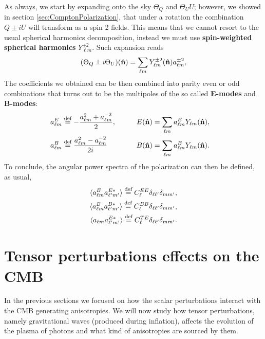 As always, we start by expanding onto the sky $\Theta_Q$ and $\Theta_UU$; however, we showed in section \ref{sec:ComptonPolarization}, that under a rotation the combination $Q\pm iU$ will transform as a spin 2 fields. This means that we cannot resort to the usual spherical harmonics decomposition, instead we must use \textbf{spin-weighted spherical harmonics} $Y_{\ell m}^{\pm2}$. Such expansion reads
\begin{equation}
    (\Theta_Q\pm i\Theta_U)(\mathbf{\hat{n}})=\sum_{\ell m} Y^{\pm2}_{\ell m}(\mathbf{\hat{n}})a^{\pm2}_{\ell m} ,\label{eq:EB_sky_expansion}
\end{equation}
The coefficients we obtained can be then combined into parity even or odd combinations that turns out to be the multipoles of the so called \textbf{E-modes} and \textbf{B-modes}:
\begin{align*}
    a^E_{\ell m}&\stackrel{\text{def}}{=}-\frac{a^2_{\ell m}+a^{-2}_{\ell m}}{2},\qquad &E(\mathbf{\hat{n}})=\sum_{\ell m}a^E_{\ell m}Y_{\ell m}(\mathbf{\hat{n}}),&&\\ a^B_{\ell m}&\stackrel{\text{def}}{=}\frac{a^2_{\ell m}-a^{-2}_{\ell m}}{2i}
    \qquad &B(\mathbf{\hat{n}})=\sum_{\ell m}a^B_{\ell m}Y_{\ell m}(\mathbf{\hat{n}}).&&
\end{align*}
To conclude, the angular power spectra of the polarization can then be defined, as usual,
\begin{subequations}
    \label{eq:PolPowerSpectrum}
\begin{align}
    \langle a^E_{\ell m}a^{E*}_{\ell' m'}\rangle\stackrel{\text{def}}{=} C_{\ell}^{EE}\delta_{\ell \ell'}\delta_{m m'},\\ \langle a^B_{\ell m}a^{B*}_{\ell' m'}\rangle\stackrel{\text{def}}{=} C_{\ell}^{BB}\delta_{\ell \ell'}\delta_{m m'},\\\langle a_{\ell m}a^{E*}_{\ell' m'}\rangle\stackrel{\text{def}}{=} C_{\ell}^{TE}\delta_{\ell \ell'}\delta_{m m'}.
\end{align}
\end{subequations}
\section{Tensor perturbations effects on the CMB}\label{sec:Anisotropies_From_Tensor}
In the previous sections we focused on how the scalar perturbations interact with the CMB generating anisotropies. We will now study how tensor perturbations, namely gravitational waves (produced during inflation), affects the evolution of the plasma of photons and what kind of anisotropies are sourced by them.

